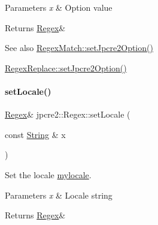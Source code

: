 \begin{DoxyParams}{Parameters}
{\em x} & Option value \\
\hline
\end{DoxyParams}
\begin{DoxyReturn}{Returns}
\hyperlink{classjpcre2_1_1Regex}{Regex}\& 
\end{DoxyReturn}
\begin{DoxySeeAlso}{See also}
\hyperlink{classjpcre2_1_1RegexMatch_a0d76033d9c134caa9ddfc21849603920_a0d76033d9c134caa9ddfc21849603920}{Regex\+Match\+::set\+Jpcre2\+Option()} 

\hyperlink{classjpcre2_1_1RegexReplace_a745ab0b979035214a83ed0a04686ef6a_a745ab0b979035214a83ed0a04686ef6a}{Regex\+Replace\+::set\+Jpcre2\+Option()} 
\end{DoxySeeAlso}
\hypertarget{classjpcre2_1_1Regex_a56721534519e5cb436337043eee8f42d_a56721534519e5cb436337043eee8f42d}{}\label{classjpcre2_1_1Regex_a56721534519e5cb436337043eee8f42d_a56721534519e5cb436337043eee8f42d} 
\paragraph{\texorpdfstring{set\+Locale()}{setLocale()}}
{\footnotesize\ttfamily \hyperlink{classjpcre2_1_1Regex}{Regex}\& jpcre2\+::\+Regex\+::set\+Locale (\begin{DoxyParamCaption}\item[{const \hyperlink{namespacejpcre2_a91f03070152fb228bc116c5a737f1d16}{String} \&}]{x }\end{DoxyParamCaption})\hspace{0.3cm}{\ttfamily [inline]}}



Set the locale \hyperlink{classjpcre2_1_1Regex_a92a3ad992cade62d103248302f7e2f2d}{mylocale}. 


\begin{DoxyParams}{Parameters}
{\em x} & Locale string \\
\hline
\end{DoxyParams}
\begin{DoxyReturn}{Returns}
\hyperlink{classjpcre2_1_1Regex}{Regex}\& 
\end{DoxyReturn}
\hypertarget{classjpcre2_1_1Regex_aed9865b58c60945e19f36fa310f5a595_aed9865b58c60945e19f36fa310f5a595}{}\label{classjpcre2_1_1Regex_aed9865b58c60945e19f36fa310f5a595_aed9865b58c60945e19f36fa310f5a595} 
